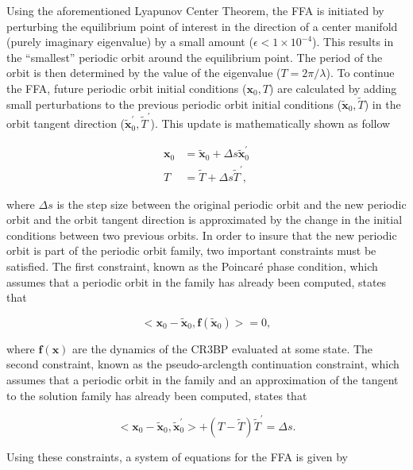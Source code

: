 \documentclass[11pt]{article} %
\begin{document}
\noindent
Using the aforementioned Lyapunov Center Theorem, the FFA is initiated by perturbing the equilibrium point of interest in the direction of a center manifold (purely imaginary eigenvalue) by a small amount ($\epsilon < 1\times10^{-4}$). This results in the ``smallest'' periodic orbit around the equilibrium point. The period of the orbit is then determined by the value of the eigenvalue ($T=2\pi/\lambda$). To continue the FFA, future periodic orbit initial conditions ($\bm{x}_0, T$) are calculated by adding small perturbations to the previous periodic orbit initial conditions ($\tilde{\bm{x}}_0, \tilde{T}$) in the orbit tangent direction ($\tilde{\bm{x}}_0^{\prime}, \tilde{T}^{\prime}$). This update is mathematically shown as follow

\begin{align}
	\bm{x}_0 &= \tilde{\bm{x}}_0 + \Delta s\tilde{\bm{x}}_0^{\prime} \\
	T &= \tilde{T} + \Delta s\tilde{T}^{\prime},
\end{align}

\noindent
where $\Delta s$ is the step size between the original periodic orbit and the new periodic orbit and the orbit tangent direction is approximated by the change in the initial conditions between two previous orbits. In order to insure that the new periodic orbit is part of the periodic orbit family, two important constraints must be satisfied. The first constraint, known as the Poincar\'{e} phase condition, which assumes that a periodic orbit in the family has already been computed, states that 

\begin{equation}
	<\bm{x}_0 - \tilde{\bm{x}}_0, \bm{f}\left(\tilde{\bm{x}}_0\right)> = 0,
\end{equation}

\noindent
where $\bm{f}\left(\bm{x}\right)$ are the dynamics of the CR3BP evaluated at some state. The second constraint, known as the pseudo-arclength continuation constraint, which assumes that a periodic orbit in the family and an approximation of the tangent to the solution family has already been computed, states that

\begin{equation}
<\bm{x}_0 - \tilde{\bm{x}}_0, \tilde{\bm{x}}_0^{\prime}> + \left(T-\tilde{T}\right)\tilde{T}^{\prime} = \Delta s.
\end{equation}

\noindent
Using these constraints, a system of equations for the FFA is given by
\end{document}

